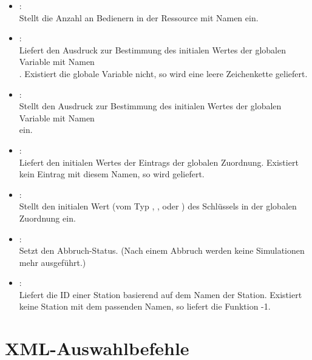 \begin{itemize}
\item
{}:\\
Stellt die Anzahl an Bedienern in der Ressource mit Namen  ein.

\item
{}:\\
Liefert den Ausdruck zur Bestimmung des initialen Wertes der globalen Variable
mit Namen\\. Existiert die globale Variable nicht, so wird
eine leere Zeichenkette geliefert.

\item
{}:\\
Stellt den Ausdruck zur Bestimmung des initialen Wertes der globalen Variable
mit Namen\\ ein. 

\item
{}:\\
Liefert den initialen Wertes der Eintrags  der globalen Zuordnung.
Existiert kein Eintrag mit diesem Namen, so wird  geliefert.

\item
{}:\\
Stellt den initialen Wert (vom Typ , ,  oder ) des Schlüssels 
in der globalen Zuordnung ein. 

\item
{}:\\
Setzt den Abbruch-Status. (Nach einem Abbruch werden keine Simulationen mehr ausgeführt.)

\item
{}:\\
Liefert die ID einer Station basierend auf dem Namen der Station.
Existiert keine Station mit dem passenden Namen, so liefert die Funktion -1.

\end{itemize}



\chapter{XML-Auswahlbefehle}

